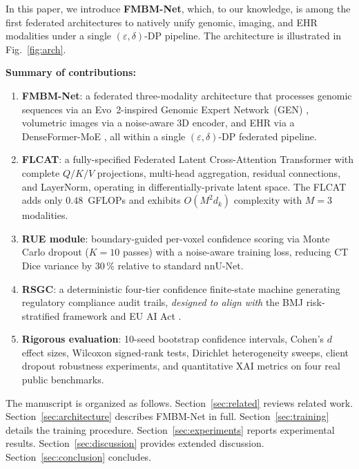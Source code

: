 \documentclass[a4paper,fleqn]{cas-dc}
\begin{document}
In this paper, we introduce \textbf{FMBM-Net}, which, to our knowledge,
is among the first federated architectures to natively unify genomic, imaging,
and EHR modalities under a single $(\varepsilon,\delta)$-DP pipeline. The
architecture is illustrated in Fig.~\ref{fig:arch}.

\textbf{Summary of contributions:}
\begin{enumerate}
\item \textbf{FMBM-Net}: a federated three-modality architecture that processes
  genomic sequences via an Evo~2-inspired Genomic Expert Network~(GEN)
  \citep{evo2_2026}, volumetric images via a noise-aware 3D encoder, and EHR
  via a DenseFormer-MoE \citep{denseformer2024}, all within a single
  $(\varepsilon,\delta)$-DP federated pipeline.

\item \textbf{FLCAT}: a fully-specified Federated Latent Cross-Attention
  Transformer with complete $Q/K/V$ projections, multi-head aggregation,
  residual connections, and LayerNorm, operating in differentially-private
  latent space. The FLCAT adds only $0.48$~GFLOPs and exhibits
  $O(M^2 d_k)$ complexity with $M\!=\!3$ modalities.

\item \textbf{RUE module}: boundary-guided per-voxel confidence scoring via
  Monte Carlo dropout ($K\!=\!10$ passes) with a noise-aware training loss,
  reducing CT Dice variance by $30\,\%$ relative to standard nnU-Net.

\item \textbf{RSGC}: a deterministic four-tier confidence finite-state machine
  generating regulatory compliance audit trails, \emph{designed to align with}
  the BMJ risk-stratified framework \citep{bmj_governance_2026} and EU AI
  Act \citep{eu_ai_act_2024}.

\item \textbf{Rigorous evaluation}: 10-seed bootstrap confidence intervals,
  Cohen's $d$ effect sizes, Wilcoxon signed-rank tests, Dirichlet
  heterogeneity sweeps, client dropout robustness experiments, and quantitative
  XAI metrics on four real public benchmarks.
\end{enumerate}

The manuscript is organized as follows.
Section~\ref{sec:related} reviews related work.
Section~\ref{sec:architecture} describes FMBM-Net in full.
Section~\ref{sec:training} details the training procedure.
Section~\ref{sec:experiments} reports experimental results.
Section~\ref{sec:discussion} provides extended discussion.
Section~\ref{sec:conclusion} concludes.
\end{document}
